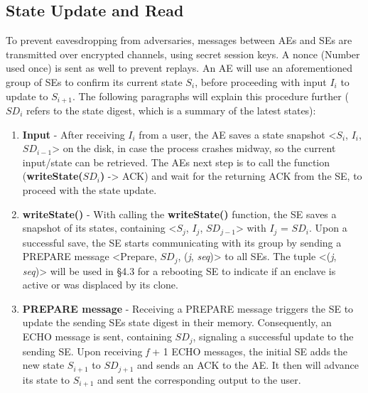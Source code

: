 \subsection{State Update and Read}

To prevent eavesdropping from adversaries, messages between AEs and SEs are transmitted over encrypted channels, using secret session keys. A nonce (Number used once) is sent as well to prevent replays. An AE will use an aforementioned group of SEs to confirm its current state \(S_i\), before proceeding with input \(I_i\) to update to \(S_{i+1}\). The following paragraphs will explain this procedure further (\(SD_{i}\) refers to the state digest, which is a summary of the latest states):

\begin{enumerate}
    \item \textbf{Input} - After receiving \(I_i\) from a user, the AE saves a state snapshot <\(S_i\), \(I_i\), \(SD_{i-1}\)> on the disk, in case the process crashes midway, so the current input/state can be retrieved. The AEs next step is to call the function (\textbf{writeState(\(SD_i\))} -> ACK) and wait for the returning ACK from the SE, to proceed with the state update.
    \item \textbf{writeState()} - With calling the \textbf{writeState()} function, the SE saves a snapshot of its states, containing <\(S_j\), \(I_j\), \(SD_{j-1}\)> with \(I_j\) = \(SD_{i}\). Upon a successful save, the SE starts communicating with its group by sending a PREPARE message <Prepare, \(SD_{j}\), (\textit{j}, \textit{seq})> to all SEs. The tuple <(\textit{j}, \textit{seq})> will be used in §4.3 for a rebooting SE to indicate if an enclave is active or was displaced by its clone.
    \item \textbf{PREPARE message} - Receiving a PREPARE message triggers the SE to update the sending SEs state digest in their memory. Consequently, an ECHO message is sent, containing \(SD_{j}\), signaling a successful update to the sending SE. Upon receiving \textit{f} + 1 ECHO messages, the initial SE adds the new state \(S_{i+1}\) to \(SD_{j+1}\) and sends an ACK to the AE. It then will advance its state to \(S_{i+1}\) and sent the corresponding output to the user.
\end{enumerate}

